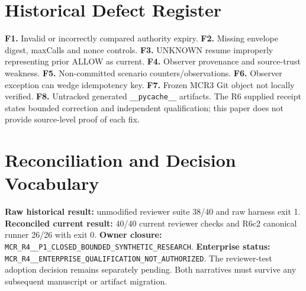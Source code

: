 \documentclass[11pt,twocolumn]{article}
\newcommand{\code}[1]{\texttt{#1}}
\begin{document}
\section{Historical Defect Register}
\noindent\textbf{F1.} Invalid or incorrectly compared authority expiry. \textbf{F2.} Missing envelope digest, maxCalls and nonce controls. \textbf{F3.} UNKNOWN resume improperly representing prior ALLOW as current. \textbf{F4.} Observer provenance and source-trust weakness. \textbf{F5.} Non-committed scenario counters/observations. \textbf{F6.} Observer exception can wedge idempotency key. \textbf{F7.} Frozen MCR3 Git object not locally verified. \textbf{F8.} Untracked generated \code{\_\allowbreak \_\allowbreak pycache\_\allowbreak \_\allowbreak } artifacts. The R6 supplied receipt states bounded correction and independent qualification; this paper does not provide source-level proof of each fix.

\section{Reconciliation and Decision Vocabulary}
\noindent\textbf{Raw historical result:} unmodified reviewer suite 38/40 and raw harness exit 1. \textbf{Reconciled current result:} 40/40 current reviewer checks and R6c2 canonical runner 26/26 with exit 0. \textbf{Owner closure:} \code{MCR\_\allowbreak R4\_\_\allowbreak P1\_\allowbreak CLOSED\_\allowbreak BOUNDED\_\allowbreak SYNTHETIC\_\allowbreak RESEARCH}. \textbf{Enterprise status:} \code{MCR\_\allowbreak R4\_\_\allowbreak ENTERPRISE\_\allowbreak QUALIFICATION\_\allowbreak NOT\_\allowbreak AUTHORIZED}. The reviewer-test adoption decision remains separately pending. Both narratives must survive any subsequent manuscript or artifact migration.
\end{document}

